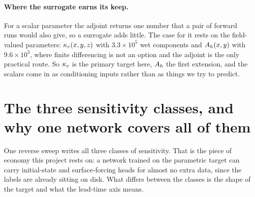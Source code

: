 \paragraph{Where the surrogate earns its keep.}
For a scalar parameter the adjoint returns one number that a pair of forward
runs would also give, so a surrogate adds little. The case for it rests on the
field-valued parameters: $\kappa_{v}(x,y,z)$ with $3.3\times10^{5}$ wet components and
$A_{h}(x,y)$ with $9.6\times10^{3}$, where finite differencing is not an option
and the adjoint is the only practical route. So $\kappa_{v}$ is the primary target
here, $A_{h}$ the first extension, and the scalars come in as conditioning inputs
rather than as things we try to predict.

\section{The three sensitivity classes, and why one network covers all of them}
\label{sec:classes}

One reverse sweep writes all three classes of sensitivity. That is the piece of
economy this project rests on: a network trained on the parametric target can
carry initial-state and surface-forcing heads for almost no extra data, since
the labels are already sitting on disk. What differs between the classes is the
shape of the target and what the lead-time axis means.

